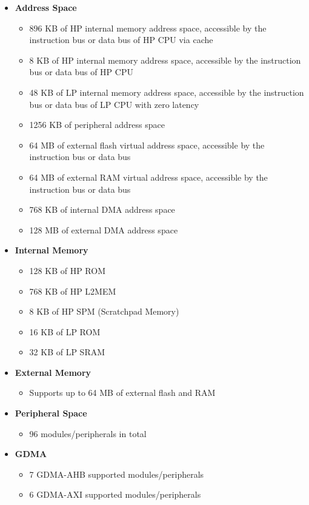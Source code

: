 \documentclass[main\_\_EN.tex]{subfiles}
\begin{document}
\begin{itemize}
    \item {\bfseries Address Space}
        \begin{itemize}
    	    \item 896 KB of HP internal memory address space, accessible by the instruction bus or data bus of HP CPU via cache
            \item 8 KB of HP internal memory address space, accessible by the instruction bus or data bus of HP CPU
            \item 48 KB of LP internal memory address space, accessible by the instruction bus or data bus of LP CPU with zero latency
    	    \item 1256 KB of peripheral address space
    	    \item 64 MB of external flash virtual address space, accessible by the instruction bus or data bus
            \item 64 MB of external RAM virtual address space, accessible by the instruction bus or data bus
    	    \item 768 KB of internal DMA address space
    	    \item 128 MB of external DMA address space
        \end{itemize}
    \item {\bfseries Internal Memory}
        \begin{itemize}
            \item 128 KB of HP ROM
	        \item 768 KB of HP L2MEM
            \item 8 KB of HP SPM (Scratchpad Memory)
            \item 16 KB of LP ROM
            \item 32 KB of LP SRAM
	    \end{itemize}
    \item {\bfseries External Memory}
        \begin{itemize}
            \item Supports up to 64 MB of external flash and RAM
	    \end{itemize}
    \item \textbf{Peripheral Space}
        \begin{itemize}
           \item 96 modules/peripherals in total
        \end{itemize}
    \item {\bfseries GDMA}
        \begin{itemize}
            \item 7 GDMA-AHB supported modules/peripherals
            \item 6 GDMA-AXI supported modules/peripherals
        \end{itemize}
\end{itemize}
\end{document}
